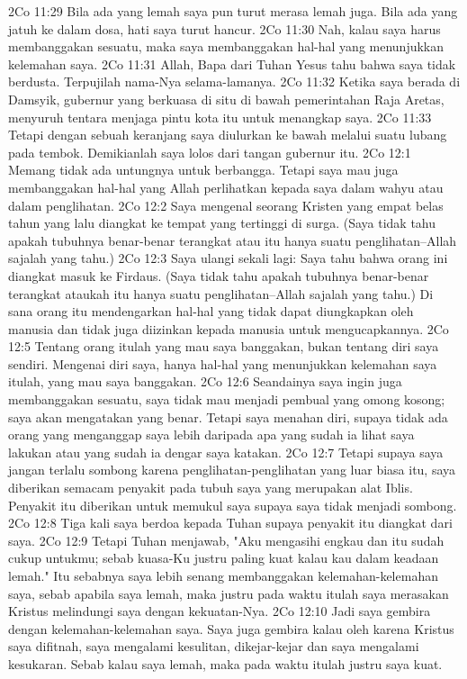 2Co 11:29  Bila ada yang lemah saya pun turut merasa lemah juga. Bila ada yang jatuh ke dalam dosa, hati saya turut hancur.
2Co 11:30  Nah, kalau saya harus membanggakan sesuatu, maka saya membanggakan hal-hal yang menunjukkan kelemahan saya.
2Co 11:31  Allah, Bapa dari Tuhan Yesus tahu bahwa saya tidak berdusta. Terpujilah nama-Nya selama-lamanya.
2Co 11:32  Ketika saya berada di Damsyik, gubernur yang berkuasa di situ di bawah pemerintahan Raja Aretas, menyuruh tentara menjaga pintu kota itu untuk menangkap saya.
2Co 11:33  Tetapi dengan sebuah keranjang saya diulurkan ke bawah melalui suatu lubang pada tembok. Demikianlah saya lolos dari tangan gubernur itu.
2Co 12:1  Memang tidak ada untungnya untuk berbangga. Tetapi saya mau juga membanggakan hal-hal yang Allah perlihatkan kepada saya dalam wahyu atau dalam penglihatan.
2Co 12:2  Saya mengenal seorang Kristen yang empat belas tahun yang lalu diangkat ke tempat yang tertinggi di surga. (Saya tidak tahu apakah tubuhnya benar-benar terangkat atau itu hanya suatu penglihatan--Allah sajalah yang tahu.)
2Co 12:3  Saya ulangi sekali lagi: Saya tahu bahwa orang ini diangkat masuk ke Firdaus. (Saya tidak tahu apakah tubuhnya benar-benar terangkat ataukah itu hanya suatu penglihatan--Allah sajalah yang tahu.) Di sana orang itu mendengarkan hal-hal yang tidak dapat diungkapkan oleh manusia dan tidak juga diizinkan kepada manusia untuk mengucapkannya.
2Co 12:5  Tentang orang itulah yang mau saya banggakan, bukan tentang diri saya sendiri. Mengenai diri saya, hanya hal-hal yang menunjukkan kelemahan saya itulah, yang mau saya banggakan.
2Co 12:6  Seandainya saya ingin juga membanggakan sesuatu, saya tidak mau menjadi pembual yang omong kosong; saya akan mengatakan yang benar. Tetapi saya menahan diri, supaya tidak ada orang yang menganggap saya lebih daripada apa yang sudah ia lihat saya lakukan atau yang sudah ia dengar saya katakan.
2Co 12:7  Tetapi supaya saya jangan terlalu sombong karena penglihatan-penglihatan yang luar biasa itu, saya diberikan semacam penyakit pada tubuh saya yang merupakan alat Iblis. Penyakit itu diberikan untuk memukul saya supaya saya tidak menjadi sombong.
2Co 12:8  Tiga kali saya berdoa kepada Tuhan supaya penyakit itu diangkat dari saya.
2Co 12:9  Tetapi Tuhan menjawab, "Aku mengasihi engkau dan itu sudah cukup untukmu; sebab kuasa-Ku justru paling kuat kalau kau dalam keadaan lemah." Itu sebabnya saya lebih senang membanggakan kelemahan-kelemahan saya, sebab apabila saya lemah, maka justru pada waktu itulah saya merasakan Kristus melindungi saya dengan kekuatan-Nya.
2Co 12:10  Jadi saya gembira dengan kelemahan-kelemahan saya. Saya juga gembira kalau oleh karena Kristus saya difitnah, saya mengalami kesulitan, dikejar-kejar dan saya mengalami kesukaran. Sebab kalau saya lemah, maka pada waktu itulah justru saya kuat.

